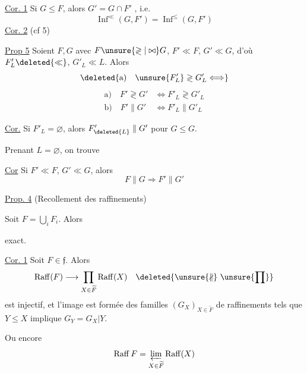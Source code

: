 
\uline{Cor. 1} Si $G\leq F$, alors $G'=G\cap F'$ , i.e.
\[
\operatorname{Inf}^{\ll}(G,F')=\operatorname{Inf}^{\leq}(G,F')
\]
\uline{Cor. 2} (cf   5)

\uline{Prop 5} Soient $F,G$ avec $F\unsure{\gtrless|\bowtie}G$,  $F'\ll F$, $G'\ll G$, d'où $F'_L\deleted{\ll}$, $G'_L\ll L$. Alors
\[
\deleted{\text{a)}\quad\unsure{F'_L}\gtrless G'_L\Longleftrightarrow}
\]
\[
\begin{aligned}
\text{a)}\quad F'\gtrless G'&\Longleftrightarrow F'_L\gtrless G'_L\\
\text{b)}\quad F'\parallel G'&\Longleftrightarrow F'_L\parallel G'_L
\end{aligned}
\]

\uline{Cor.} Si $F'_L=\varnothing$, alors $F'_{\deleted{L}}\parallel G'$ pour  $G\leq G$.


Prenant $L=\varnothing$, on trouve

\uline{Cor}  Si $F'\ll F$, $G'\ll G$, alors
\[
F\parallel G\Longrightarrow F'\parallel G'
\]


\uline{Prop. 4} (Recollement des raffinements)

Soit $F=\bigcup_i F_i$. Alors 


exact.

\uline{Cor. 1} Soit $F\in\mathfrak f$. Alors
\[
\operatorname{Raff}(F)\longrightarrow\prod_{X\in\widetilde F}\operatorname{Raff}(X)\quad\deleted{\unsure{\nparallel}\ \unsure{\prod}}
\]
est injectif, et l'image est formée des familles $(G_X)_{X\in\widetilde F}$ de raffinements tels que $Y\leq X$ implique $G_Y=G_X|Y$.

Ou encore
\[
\operatorname{Raff}F=\varprojlim_{X\in\widetilde F}\operatorname{Raff}(X)
\]
